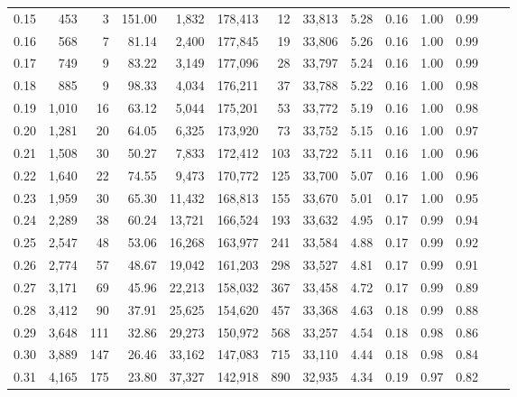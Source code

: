 \begin{tabular}{rrrrrrrrrrrrrr}
0.15 &    453 &      3 &  151.00 &    1,832 &  178,413 &      12 &  33,813 &  5.28 &  0.16 &  1.00 &      0.99 \\
0.16 &    568 &      7 &   81.14 &    2,400 &  177,845 &      19 &  33,806 &  5.26 &  0.16 &  1.00 &      0.99 \\
0.17 &    749 &      9 &   83.22 &    3,149 &  177,096 &      28 &  33,797 &  5.24 &  0.16 &  1.00 &      0.99 \\
0.18 &    885 &      9 &   98.33 &    4,034 &  176,211 &      37 &  33,788 &  5.22 &  0.16 &  1.00 &      0.98 \\
0.19 &  1,010 &     16 &   63.12 &    5,044 &  175,201 &      53 &  33,772 &  5.19 &  0.16 &  1.00 &      0.98 \\
0.20 &  1,281 &     20 &   64.05 &    6,325 &  173,920 &      73 &  33,752 &  5.15 &  0.16 &  1.00 &      0.97 \\
0.21 &  1,508 &     30 &   50.27 &    7,833 &  172,412 &     103 &  33,722 &  5.11 &  0.16 &  1.00 &      0.96 \\
0.22 &  1,640 &     22 &   74.55 &    9,473 &  170,772 &     125 &  33,700 &  5.07 &  0.16 &  1.00 &      0.96 \\
0.23 &  1,959 &     30 &   65.30 &   11,432 &  168,813 &     155 &  33,670 &  5.01 &  0.17 &  1.00 &      0.95 \\
0.24 &  2,289 &     38 &   60.24 &   13,721 &  166,524 &     193 &  33,632 &  4.95 &  0.17 &  0.99 &      0.94 \\
0.25 &  2,547 &     48 &   53.06 &   16,268 &  163,977 &     241 &  33,584 &  4.88 &  0.17 &  0.99 &      0.92 \\
0.26 &  2,774 &     57 &   48.67 &   19,042 &  161,203 &     298 &  33,527 &  4.81 &  0.17 &  0.99 &      0.91 \\
0.27 &  3,171 &     69 &   45.96 &   22,213 &  158,032 &     367 &  33,458 &  4.72 &  0.17 &  0.99 &      0.89 \\
0.28 &  3,412 &     90 &   37.91 &   25,625 &  154,620 &     457 &  33,368 &  4.63 &  0.18 &  0.99 &      0.88 \\
0.29 &  3,648 &    111 &   32.86 &   29,273 &  150,972 &     568 &  33,257 &  4.54 &  0.18 &  0.98 &      0.86 \\
0.30 &  3,889 &    147 &   26.46 &   33,162 &  147,083 &     715 &  33,110 &  4.44 &  0.18 &  0.98 &      0.84 \\
0.31 &  4,165 &    175 &   23.80 &   37,327 &  142,918 &     890 &  32,935 &  4.34 &  0.19 &  0.97 &      0.82 \\

\end{tabular}
